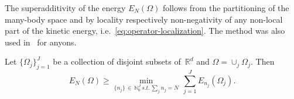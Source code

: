 \documentclass[AHL, Unicode, longabstracts, published]{cedram}
\newcommand*\R {\mathbb{R}}
\newcommand\1{{\ensuremath {\mathds 1} }}
\begin{document}
The superadditivity of the energy $E_N(\Omega)$ follows from the partitioning of the many-body space and by locality respectively non-negativity of any non-local part of the kinetic energy, i.e.~\eqref{eq:operator-localization}. The method was also used in~\cite[Lemma~4.2]{LunSei-18} for anyons.

\begin{lemm}\label{lem:superadd}
Let $\{\Omega_j\}_{j=1}^J$ be a collection of disjoint subsets of~$\R^d$ and $\Omega=\cup_{j} \Omega_j$. Then
\begin{equation}\label{eq:superadd}
E_N(\Omega) \geq \min_{\{n_j\}\,\in\,\mathbb{N}_0^J \, s.t. \, \sum_{j} n_j=N} \, \sum_{j=1}^J E_{n_j}(\Omega_j).
\end{equation}
\end{lemm}
\end{document}
